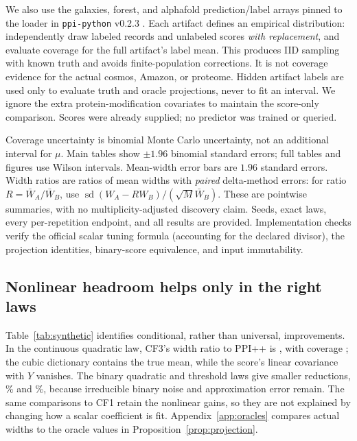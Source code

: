\documentclass{article}
\begin{document}
We also use the galaxies, forest, and alphafold prediction/label arrays pinned to the loader in \texttt{ppi-python} v0.2.3 \citep{ppicode}. Each artifact defines an empirical distribution: independently draw labeled records and unlabeled scores \emph{with replacement}, and evaluate coverage for the full artifact's label mean. This produces IID sampling with known truth and avoids finite-population corrections. It is not coverage evidence for the actual cosmos, Amazon, or proteome. Hidden artifact labels are used only to evaluate truth and oracle projections, never to fit an interval. We ignore the extra protein-modification covariates to maintain the score-only comparison. Scores were already supplied; no predictor was trained or queried.

Coverage uncertainty is binomial Monte Carlo uncertainty, not an additional interval for $\mu$. Main tables show $\pm1.96$ binomial standard errors; full tables and figures use Wilson intervals. Mean-width error bars are $1.96$ standard errors. Width ratios are ratios of mean widths with \emph{paired} delta-method errors: for ratio $R=\bar W_A/\bar W_B$, use $\operatorname{sd}(W_A-RW_B)/(\sqrt{M}\bar W_B)$. These are pointwise summaries, with no multiplicity-adjusted discovery claim. Seeds, exact laws, every per-repetition endpoint, and all results are provided. Implementation checks verify the official scalar tuning formula (accounting for the declared divisor), the projection identities, binary-score equivalence, and input immutability.

\subsection{Nonlinear headroom helps only in the right laws}
\begin{table}[t]
 \caption{Synthetic main comparison at $n=800$, $N=8,000$, 5,000 paired repetitions. Coverage is percent $\pm1.96$ Monte Carlo standard errors; width ratios have paired 95\% Monte Carlo error bars. CF3 uses cubic controls; CF1 uses only the affine score. Rare-event widths must be interpreted together with their failed coverage.}
 \label{tab:synthetic}\centering
 \resizebox{\linewidth}{!}{}
\end{table}
Table~\ref{tab:synthetic} identifies conditional, rather than universal, improvements. In the continuous quadratic law, CF3's width ratio to PPI++ is \QuadRatio{}, with coverage \QuadCoverage{}; the cubic dictionary contains the true mean, while the score's linear covariance with $Y$ vanishes. The binary quadratic and threshold laws give smaller reductions, \QuadBinaryReduction\% and \StepReduction\%, because irreducible binary noise and approximation error remain. The same comparisons to CF1 retain the nonlinear gains, so they are not explained by changing how a scalar coefficient is fit. Appendix~\ref{app:oracles} compares actual widths to the oracle values in Proposition~\ref{prop:projection}.
\end{document}
